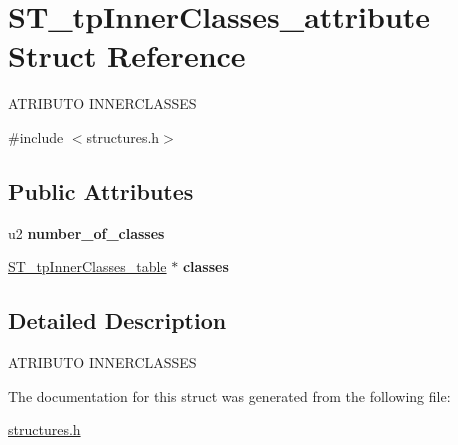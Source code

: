 \hypertarget{structST__tpInnerClasses__attribute}{}\section{S\+T\+\_\+tp\+Inner\+Classes\+\_\+attribute Struct Reference}
\label{structST__tpInnerClasses__attribute}




 A\+T\+R\+I\+B\+U\+TO I\+N\+N\+E\+R\+C\+L\+A\+S\+S\+ES  




{\ttfamily \#include $<$structures.\+h$>$}

\subsection*{Public Attributes}
\begin{DoxyCompactItemize}
\item 
\mbox{\label{structST__tpInnerClasses__attribute_a92a86a707e58e8a2a8041c4108bd7915}} 
u2 {\bfseries number\+\_\+of\+\_\+classes}
\item 
\mbox{\label{structST__tpInnerClasses__attribute_adc0bde3e1dd14f17239ccf7ba15d6b99}} 
\mbox{\hyperlink{structST__tpInnerClasses__table}{S\+T\+\_\+tp\+Inner\+Classes\+\_\+table}} $\ast$ {\bfseries classes}
\end{DoxyCompactItemize}


\subsection{Detailed Description}


 A\+T\+R\+I\+B\+U\+TO I\+N\+N\+E\+R\+C\+L\+A\+S\+S\+ES 

The documentation for this struct was generated from the following file\+:\begin{DoxyCompactItemize}
\item 
\mbox{\hyperlink{structures_8h}{structures.\+h}}\end{DoxyCompactItemize}
